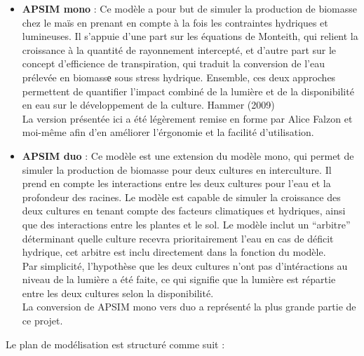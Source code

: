 \documentclass[
]{article}
\begin{document}
\begin{itemize}
\item
  \textbf{APSIM mono} : Ce modèle a pour but de simuler la production de
  biomasse chez le maïs en prenant en compte à la fois les contraintes
  hydriques et lumineuses. Il s'appuie d'une part sur les équations de
  Monteith, qui relient la croissance à la quantité de rayonnement
  intercepté, et d'autre part sur le concept d'efficience de
  transpiration, qui traduit la conversion de l'eau prélevée en biomassе
  sous stress hydrique. Ensemble, ces deux approches permettent de
  quantifier l'impact combiné de la lumière et de la disponibilité en
  eau sur le développement de la culture. Hammer (2009)\\
  La version présentée ici a été légèrement remise en forme par Alice
  Falzon et moi-même afin d'en améliorer l'érgonomie et la facilité
  d'utilisation.
\item
  \textbf{APSIM duo} : Ce modèle est une extension du modèle mono, qui
  permet de simuler la production de biomasse pour deux cultures en
  interculture. Il prend en compte les interactions entre les deux
  cultures pour l'eau et la profondeur des racines. Le modèle est
  capable de simuler la croissance des deux cultures en tenant compte
  des facteurs climatiques et hydriques, ainsi que des interactions
  entre les plantes et le sol. Le modèle inclut un ``arbitre''
  déterminant quelle culture recevra prioritairement l'eau en cas de
  déficit hydrique, cet arbitre est inclu directement dans la fonction
  du modèle.\\
  Par simplicité, l'hypothèse que les deux cultures n'ont pas
  d'intéractions au niveau de la lumière a été faite, ce qui signifie
  que la lumière est répartie entre les deux cultures selon la
  disponibilité.\\
  La conversion de APSIM mono vers duo a représenté la plus grande
  partie de ce projet.
\end{itemize}

Le plan de modélisation est structuré comme suit :
\end{document}
